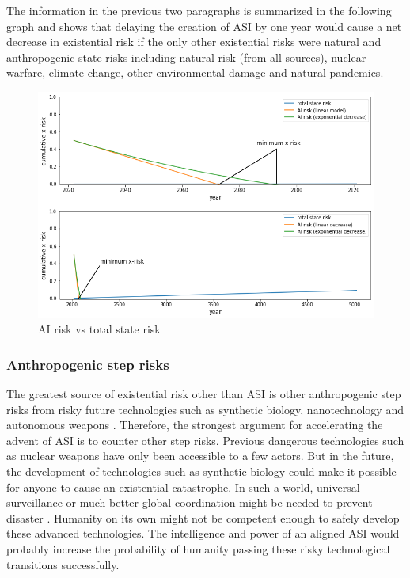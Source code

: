 \documentclass{article}
\begin{document}
The information in the previous two paragraphs is summarized in the following graph and shows that delaying the creation of ASI by one year would cause a net decrease in existential risk if the only other existential risks were natural and anthropogenic state risks including natural risk (from all sources), nuclear warfare, climate change, other environmental damage and natural pandemics.

\begin{figure}[t]
    \includegraphics[width=12cm]{ai-risk-vs-state-risk-2}
    \centering
    \caption{AI risk vs total state risk}
\end{figure}

\vspace{5mm}

\subsubsection{Anthropogenic step risks}

The greatest source of existential risk other than ASI is other anthropogenic step risks from risky future technologies such as synthetic biology, nanotechnology and autonomous weapons \cite{theprecipice, globalcatastrophicriskssurvey}. Therefore, the strongest argument for accelerating the advent of ASI is to counter other step risks. Previous dangerous technologies such as nuclear weapons have only been accessible to a few actors. But in the future, the development of technologies such as synthetic biology could make it possible for anyone to cause an existential catastrophe. In such a world, universal surveillance or much better global coordination might be needed to prevent disaster \cite{vulnerable}. Humanity on its own might not be competent enough to safely develop these advanced technologies. The intelligence and power of an aligned ASI would probably increase the probability of humanity passing these risky technological transitions successfully.
\end{document}
